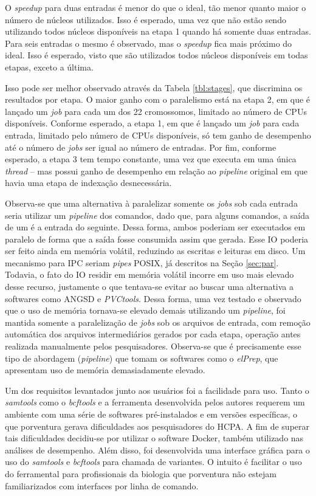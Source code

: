 \documentclass[cic,tc]{iiufrgs}
\begin{document}
O \textit{speedup} para duas entradas é menor do que o ideal, tão menor quanto
maior o número de núcleos utilizados. Isso é esperado, uma vez que não estão
sendo utilizando todos núcleos disponíveis na etapa 1 quando há somente duas
entradas. Para seis entradas o mesmo é observado, mas o \textit{speedup} fica
mais próximo do ideal. Isso é esperado, visto que são utilizados todos núcleos
disponíveis em todas etapas, exceto a última.

Isso pode ser melhor observado através da Tabela \ref{tbl:stages}, que
discrimina os resultados por etapa. O maior ganho com o paralelismo está na
etapa 2, em que é lançado um \textit{job} para cada um dos 22 cromossomos,
limitado ao número de CPUs disponíveis. Conforme esperado, a etapa 1, em que é
lançado um \textit{job} para cada entrada, limitado pelo número de CPUs
disponíveis, só tem ganho de desempenho até o número de \textit{jobs} ser igual
ao número de entradas. Por fim, conforme esperado, a etapa 3 tem tempo
constante, uma vez que executa em uma única \textit{thread} -- mas possui ganho
de desempenho em relação ao \textit{pipeline} original em que havia uma etapa
de indexação desnecessária.

Observa-se que uma alternativa à paralelizar somente os \textit{jobs} sob cada
entrada seria utilizar um \textit{pipeline} dos comandos, dado que, para alguns
comandos, a saída de um é a entrada do seguinte. Dessa forma, ambos poderiam
ser executados em paralelo de forma que a saída fosse consumida assim que
gerada. Esse IO poderia ser feito ainda em memória volátil, reduzindo as
escritas e leituras em disco. Um mecanismo para IPC seriam \textit{pipes} POSIX, já
descritos na Seção \ref{sec:par}. Todavia, o fato do IO residir em memória
volátil incorre em uso mais elevado desse recurso, justamente o que tentava-se
evitar ao buscar uma alternativa a softwares como ANGSD e \textit{PVCtools}.
Dessa forma, uma vez testado e observado que o uso de memória tornava-se
elevado demais utilizando um \textit{pipeline}, foi mantida somente a
paralelização de \textit{jobs} sob os arquivos de entrada, com remoção
automática dos arquivos intermediários gerados por cada etapa, operação antes
realizada manualmente pelos pesquisadores. Observa-se que é precisamente esse
tipo de abordagem (\textit{pipeline}) que tomam os softwares como o
\textit{elPrep}, que apresentam uso de memória demasiadamente elevado.

Um dos requisitos levantados junto aos usuários foi a facilidade para uso.
Tanto o \textit{samtools} como o \textit{bcftools} e a ferramenta desenvolvida
pelos autores requerem um ambiente com uma série de softwares pré-instalados e
em versões específicas, o que porventura gerava dificuldades aos pesquisadores
do HCPA. A fim de superar tais dificuldades decidiu-se por utilizar o software
Docker, também utilizado nas análises de desempenho. Além disso, foi
desenvolvida uma interface gráfica para o uso do \textit{samtools} e
\textit{bcftools} para chamada de variantes. O intuito é facilitar o uso do
ferramental para profissionais da biologia que porventura não estejam
familiarizados com interfaces por linha de comando.
\end{document}
